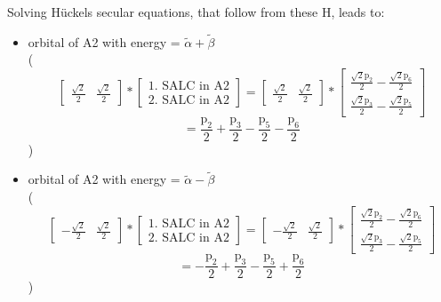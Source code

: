 \documentclass[12pt,a4paper]{article}
\begin{document}
Solving Hückels secular equations, that follow from these H, leads to:
\begin{itemize}
\item orbital of A2 with energy = 
                                $\tilde{\alpha} + \tilde{\beta}$ \\
( 
$$
\left[\begin{matrix}\frac{\sqrt{2}}{2} & \frac{\sqrt{2}}{2}\end{matrix}\right] * \left[\begin{array}{c}\text{1. SALC in A2} \\ \text{2. SALC in A2}\end{array}\right] = \left[\begin{matrix}\frac{\sqrt{2}}{2} & \frac{\sqrt{2}}{2}\end{matrix}\right] * \left[\begin{matrix}\frac{\sqrt{2} \text{p}_{2}}{2} - \frac{\sqrt{2} \text{p}_{6}}{2}\\\frac{\sqrt{2} \text{p}_{3}}{2} - \frac{\sqrt{2} \text{p}_{5}}{2}\end{matrix}\right] 
 $$ $$ = \frac{\text{p}_{2}}{2} + \frac{\text{p}_{3}}{2} - \frac{\text{p}_{5}}{2} - \frac{\text{p}_{6}}{2} 
 $$ 
 )

\item orbital of A2 with energy = 
                                $\tilde{\alpha} - \tilde{\beta}$ \\
( 
$$
\left[\begin{matrix}- \frac{\sqrt{2}}{2} & \frac{\sqrt{2}}{2}\end{matrix}\right] * \left[\begin{array}{c}\text{1. SALC in A2} \\ \text{2. SALC in A2}\end{array}\right] = \left[\begin{matrix}- \frac{\sqrt{2}}{2} & \frac{\sqrt{2}}{2}\end{matrix}\right] * \left[\begin{matrix}\frac{\sqrt{2} \text{p}_{2}}{2} - \frac{\sqrt{2} \text{p}_{6}}{2}\\\frac{\sqrt{2} \text{p}_{3}}{2} - \frac{\sqrt{2} \text{p}_{5}}{2}\end{matrix}\right] 
 $$ $$ = - \frac{\text{p}_{2}}{2} + \frac{\text{p}_{3}}{2} - \frac{\text{p}_{5}}{2} + \frac{\text{p}_{6}}{2} 
 $$ 
 )


\end{itemize}
\end{document}
